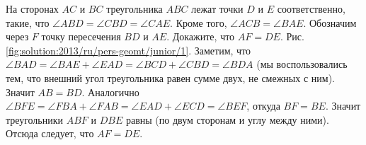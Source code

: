 \problem
На сторонах $AC$ и $BC$ треугольника $ABC$ лежат точки $D$ и $E$
соответственно, такие, что $\angle ABD = \angle CBD = \angle CAE$.
Кроме того, $\angle ACB = \angle BAE$.
Обозначим через $F$ точку пересечения $BD$ и $AE$.
Докажите, что $AF = DE$.
%
\label{solution:2013/ru/pers-geomt/junior/1}
Рис. \ref{fig:solution:2013/ru/pers-geomt/junior/1}.
Заметим, что
\(
    \angle BAD = \angle BAE + \angle EAD
=
    \angle BCD + \angle CBD = \angle BDA
\)
(мы воспользовались тем, что внешний угол треугольника равен сумме двух, не
смежных с ним).
Значит $AB = BD$.
Аналогично
\(
    \angle BFE = \angle FBA + \angle FAB
=
    \angle EAD + \angle ECD = \angle BEF
\), откуда $BF=BE$.
Значит треугольники $ABF$ и $DBE$ равны (по двум сторонам и углу между ними).
Отсюда следует, что $AF = DE$.
\endproblem
